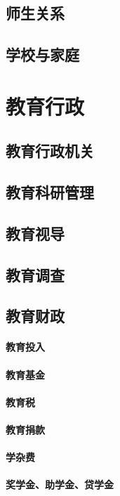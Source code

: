 \documentclass[UTF8]{../../ApplicationUniverse}
\begin{document}
\section{师生关系}
\section{学校与家庭}



\chapter{教育行政}
\section{教育行政机关}
\section{教育科研管理}
\section{教育视导}
\section{教育调查}
\section{教育财政}
    \subsubsection{教育投入}
    \subsubsection{教育基金}
    \subsubsection{教育税}
    \subsubsection{教育捐款}
    \subsubsection{学杂费}
    \subsubsection{奖学金、助学金、贷学金}
\end{document}
